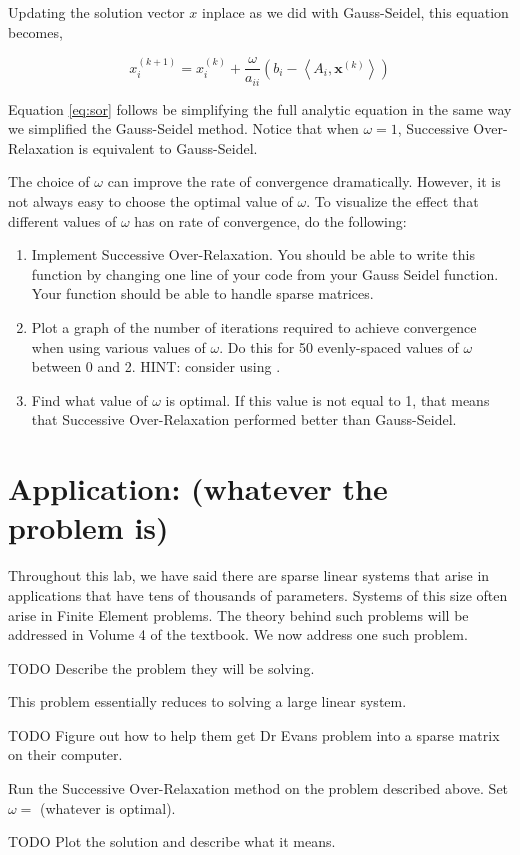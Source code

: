 Updating the solution vector $x$ inplace as we did with Gauss-Seidel, this equation becomes,

\begin{equation} \label{eq:sor}
x^{(k+1)}_i = x^{(k)}_i + \frac{\omega}{a_{ii}} \left ( b_i - \left < A_i, \mathbf{x}^{(k)} \right > \right )
\end{equation}

Equation \ref{eq:sor} follows be simplifying the full analytic equation in the same way we simplified the Gauss-Seidel method. Notice that when $\omega = 1$, Successive Over-Relaxation is equivalent to Gauss-Seidel.

\begin{problem}
The choice of $\omega$ can improve the rate of convergence dramatically. However, it is not always easy to choose the optimal value of $\omega$. To visualize the effect that different values of $\omega$ has on rate of convergence, do the following:
\begin{enumerate}
    \item Implement Successive Over-Relaxation. You should be able to write this function by changing one line of your code from your Gauss Seidel function. Your function should be able to handle sparse matrices.
    \item Plot a graph of the number of iterations required to achieve convergence when using various values of $\omega$. Do this for 50 evenly-spaced values of $\omega$ between 0 and 2. HINT: consider using .
    \item Find what value of $\omega$ is optimal. If this value is not equal to 1, that means that Successive Over-Relaxation performed better than Gauss-Seidel.
\end{enumerate}
\end{problem}

\section*{Application: (whatever the problem is)}
Throughout this lab, we have said there are sparse linear systems that arise in applications that have tens of thousands of parameters. Systems of this size often arise in Finite Element problems. The theory behind such problems will be addressed in Volume 4 of the textbook. We now address one such problem.

\begin{problem} \label{prob:application}
TODO Describe the problem they will be solving.

This problem essentially reduces to solving a large linear system.

TODO Figure out how to help them get Dr Evans problem into a sparse matrix on their computer.

Run the Successive Over-Relaxation method on the problem described above. Set $\omega = $ (whatever is optimal).

TODO Plot the solution and describe what it means.
\end{problem}
